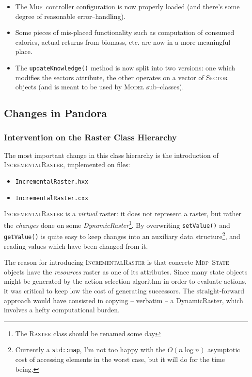\documentclass[a4paper,10pt]{article}
\newcommand{\mdp}{\textsc{Mdp}}
\begin{document}
\begin{itemize}
\item The \mdp~controller configuration is now properly loaded (and there's some degree of reasonable error--handling).
\item Some pieces of mis-placed functionality such as computation of consumed calories, actual returns from biomass, etc.
are now in a more meaningful place.
\item The \texttt{updateKnowledge()} method is now split into two versions: one which modifies the sectors attribute, the
other operates on a vector of \textsc{Sector} objects (and is meant to be used by \textsc{Model} sub--classes).
\end{itemize}

\subsection{Changes in Pandora}
\label{pandora_changes}

\subsubsection{Intervention on the Raster Class Hierarchy}

The most important change in this class hierarchy is the introduction of \textsc{IncrementalRaster}, implemented on
files:

\begin{itemize}
\item \texttt{IncrementalRaster.hxx}
\item \texttt{IncrementalRaster.cxx}
\end{itemize}

\textsc{IncrementalRaster} is a \emph{virtual} raster: it does not represent a raster, but rather the \emph{changes}
done on some \emph{DynamicRaster}\footnote{The \textsc{Raster} class should be renamed some day}. By overwriting 
\texttt{setValue()} and \texttt{getValue()} is quite easy to keep changes into an auxiliary data 
structure\footnote{Currently a \texttt{std::map}, I'm not too happy with the $O(n \log n)$ asymptotic cost of
accessing elements in the worst case, but it will do for the time being.}, and reading values which have been changed
from it.

The reason for introducing \textsc{IncrementalRaster} is that concrete \mdp~\textsc{State} objects have the \emph{resources}
raster as one of its attributes. Since many state objects might be generated by the action selection algorithm in order
to evaluate actions, it was critical to keep low the cost of generating successors. The straight-forward approach would
have consisted in copying -- verbatim -- a DynamicRaster, which involves a hefty computational burden.
\end{document}
